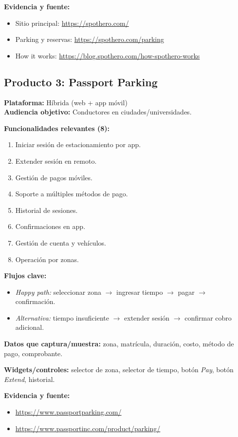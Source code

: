 \documentclass[11pt]{article}
\begin{document}
\textbf{Evidencia y fuente:}
\begin{itemize}
\item Sitio principal: \url{https://spothero.com/}
\item Parking y reservas: \url{https://spothero.com/parking}
\item How it works: \url{https://blog.spothero.com/how-spothero-works}
\end{itemize}

\subsection{Producto 3: Passport Parking}
\textbf{Plataforma:} Híbrida (web + app móvil)\\
\textbf{Audiencia objetivo:} Conductores en ciudades/universidades.

\textbf{Funcionalidades relevantes (8):}
\begin{enumerate}
\item Iniciar sesión de estacionamiento por app.
\item Extender sesión en remoto.
\item Gestión de pagos móviles.
\item Soporte a múltiples métodos de pago.
\item Historial de sesiones.
\item Confirmaciones en app.
\item Gestión de cuenta y vehículos.
\item Operación por zonas.
\end{enumerate}

\textbf{Flujos clave:}
\begin{itemize}
\item \textit{Happy path:} seleccionar zona $\rightarrow$ ingresar tiempo $\rightarrow$ pagar $\rightarrow$ confirmación.
\item \textit{Alternativa:} tiempo insuficiente $\rightarrow$ extender sesión $\rightarrow$ confirmar cobro adicional.
\end{itemize}

\textbf{Datos que captura/muestra:} zona, matrícula, duración, costo, método de pago, comprobante.

\textbf{Widgets/controles:} selector de zona, selector de tiempo, botón \textit{Pay}, botón \textit{Extend}, historial.

\textbf{Evidencia y fuente:}
\begin{itemize}
\item \url{https://www.passportparking.com/}
\item \url{https://www.passportinc.com/product/parking/}
\end{itemize}
\end{document}
